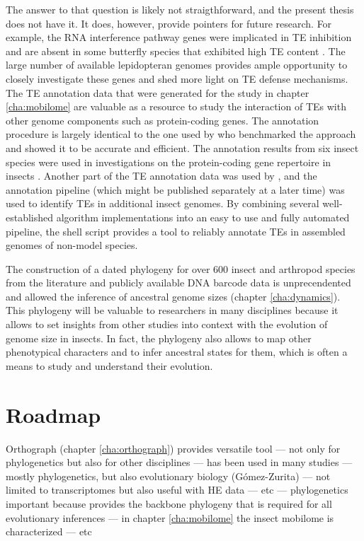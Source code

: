 The answer to that question is likely not straigthforward, and the
present thesis does not have it. It does, however, provide pointers for
future research. For example, the RNA interference pathway genes
were implicated in TE inhibition  and are absent in some
butterfly species that exhibited high TE content \citep{Dowling2017}.
The large number of available lepidopteran genomes provides ample
opportunity to closely investigate these genes and shed more light on TE
defense mechanisms.  The TE annotation data that were generated for the
study in chapter \ref{cha:mobilome} are valuable as a resource to study
the interaction of TEs with other genome components such as
protein-coding genes. The annotation procedure is largely identical to
the one used by \citet{Reinar2016} who benchmarked the approach and
showed it to be accurate and efficient. The annotation results from six
insect species  were used in
investigations on the protein-coding gene repertoire in insects
. Another part of the TE annotation data was
used by \citep{Panagiotis2018}, and the annotation pipeline (which might
be published separately at a later time) was used to identify TEs in
additional insect genomes. By combining several well-established
algorithm implementations into an easy to use and fully automated
pipeline, the shell script provides a tool to reliably annotate TEs in
assembled genomes of non-model species. 

The construction of a dated phylogeny for over 600 insect and arthropod
species from the literature and publicly available DNA barcode data is
unprecendented and allowed the inference of ancestral genome sizes
(chapter \ref{cha:dynamics}). This phylogeny will be valuable to
researchers in many disciplines because it allows to set insights from
other studies into context with the evolution of genome size in insects.
In fact, the phylogeny also allows to map other phenotypical characters
and to infer ancestral states for them, which is often a means to study
and understand their evolution.

\section{Roadmap}

Orthograph (chapter \ref{cha:orthograph}) provides versatile tool ---
not only for phylogenetics but also for other disciplines --- has been
used in many studies --- mostly phylogenetics, but also evolutionary
biology (Gómez-Zurita) --- not limited to transcriptomes but also useful
with HE data --- etc --- phylogenetics important because provides the
backbone phylogeny that is required for all evolutionary inferences ---
in chapter \ref{cha:mobilome} the insect mobilome is characterized ---
etc
